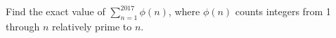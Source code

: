 Find the exact value of $\sum_{n=1}^{2017}\phi(n)$, where $\phi(n)$ counts integers from 1 through $ n $ relatively prime to $ n $.
